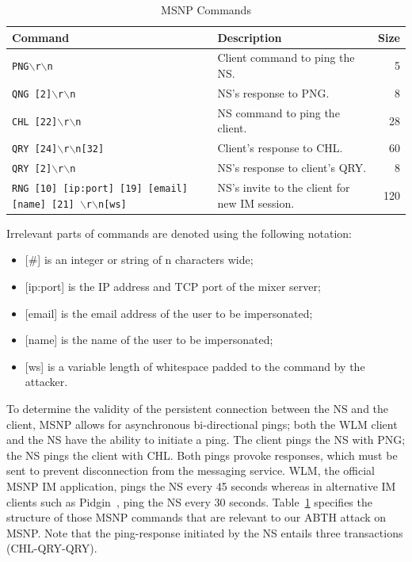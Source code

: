 \documentclass{sig-alternate}
\begin{document}
\begin{table}[tbp]
	\centering

	\caption {MSNP Commands}
	\label{tab:commandlist}

	\begin{tabular}{llr}
		\hline
		\hline
		\textbf{Command} & \textbf{Description} & \textbf{Size} \\
		\hline
		\texttt{PNG$\backslash$r$\backslash$n} & Client command to ping the NS.
& 5 \\
		\texttt{QNG [2]$\backslash$r$\backslash$n} & NS's response to PNG.
& 8 \\
		\texttt{CHL [22]$\backslash$r$\backslash$n} & NS command to ping the client.
& 28 \\
		\texttt{QRY [24]$\backslash$r$\backslash$n[32]} & Client's response to CHL.
& 60 \\
		\texttt{QRY [2]$\backslash$r$\backslash$n} & NS's response to client's QRY.
& 8 \\
		\texttt{RNG [10] [ip:port] [19] [email] [name] [21] $\backslash$r$\backslash$n[ws]} & NS's invite to the client for new IM session.
& 120 \\
		\hline
	\end{tabular}

	\begin{flushleft}
	Irrelevant parts of commands are denoted using the following notation:
	\begin{itemize}
		\item {[\#]} is an integer or string of n characters wide;
		\item {[ip:port]} is the IP address and TCP port of the mixer server;
		\item {[email]} is the email address of the user to be impersonated;
		\item {[name]} is the name of the user to be impersonated;
		\item {[ws]} is a variable length of whitespace padded to the command by the attacker.
	\end{itemize}
	\end{flushleft}

\end{table}

To determine the validity of the persistent connection between the NS and the client, MSNP allows for asynchronous bi-directional pings; both the WLM client and the NS have the ability to initiate a ping.
The client pings the NS with PNG; the NS pings the client with CHL.
Both pings provoke responses, which must be sent to prevent disconnection from the messaging service.
WLM, the official MSNP IM application, pings the NS every 45 seconds whereas in alternative IM clients such as Pidgin~\cite{pidgin:url}, ping the NS every 30 seconds.
Table~\ref{tab:commandlist} specifies the structure of those MSNP commands that are relevant to our ABTH attack on MSNP.
Note that the ping-response initiated by the NS entails three transactions (CHL-QRY-QRY).
\end{document}

